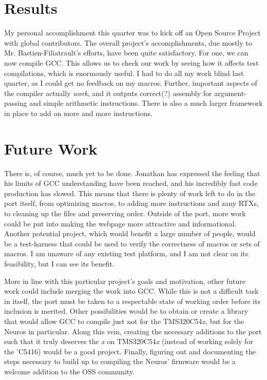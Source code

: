 \documentclass{article}
\begin{document}
\section{Results}

My personal accomplishment this quarter was to kick off an Open Source Project
with global contributors. The overall project's accomplishments, due mostly to
Mr. Bastien-Filiatrault's efforts, have been quite satisfactory. For one, we can
now compile GCC. This allows us to check our work by seeing how it affects test
compilations, which is enormously useful. I had to do all my work blind last
quarter, as I could get no feedback on my macros. Further, important aspects of
the compiler actually \emph{work}, and it outputs correct(?) assembly for
argument-passing and simple arithmetic instructions. There is also a much larger
framework in place to add on more and more instructions.

\section{Future Work}

There is, of course, much yet to be done. Jonathan has expressed the feeling
that his limits of GCC understanding have been reached, and his incredibly fast
code production has slowed. This means that there is plenty of work left to do
in the port itself, from optimizing macros, to adding more instructions and zany
RTXs, to cleaning up the files and preserving order. Outside of the port, more
work could be put into making the webpage more attractive and informational.
Another potential project, which would benefit a large number of people, would
be a test-harness that could be used to verify the correctness of macros or sets
of macros. I am unaware of any existing test platform, and I am not clear on its
feasibility, but I can see its benefit. 

More in line with this particular project's goals and motivation, other future
work could include merging the work into GCC. While this is not a difficult task
in itself, the port must be taken to a respectable state of working order before
its inclusion is merited. Other possibilities would be to obtain or create a
library that would allow GCC to compile just not for the TMS320C54\emph{x}, but
for the Neuros in particular. Along this vein, creating the necessary additions
to the port such that it truly deserves the \emph{x} on TMS320C54\emph{x}
(instead of working solely for the 'C5416) would be a good project. Finally,
figuring out and documenting the steps necessary to build up to compiling the
Neuros' firmware would be a welcome addition to the OSS community.
\end{document}
